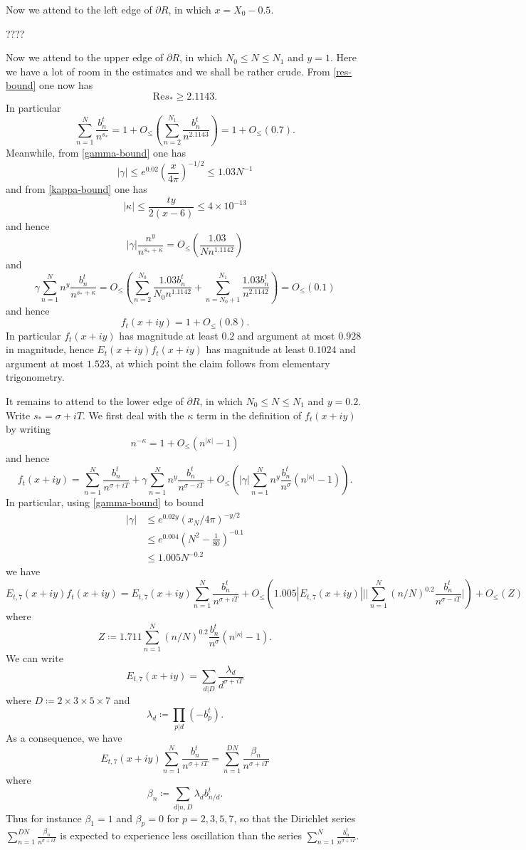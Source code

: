Now we attend to the left edge of $\partial R$, in which $x = X_0 - 0.5$.

????

Now we attend to the upper edge of $\partial R$, in which $N_0 \leq N \leq N_1$ and $y=1$.  Here we have a lot of room in the estimates and we shall be rather crude.  From \eqref{res-bound} one now has
$$ \mathrm{Re} s_* \geq 2.1143.$$
In particular
$$ \sum_{n=1}^N \frac{b_n^t}{n^{s_*}} = 1 + O_{\leq}( \sum_{n=2}^{N_1} \frac{b_n^t}{n^{2.1143}} ) = 1 + O_{\leq}( 0.7 ).$$
Meanwhile, from \eqref{gamma-bound} one has
$$ |\gamma| \leq e^{0.02} \left( \frac{x}{4\pi} \right)^{-1/2} \leq 1.03 N^{-1}$$
and from \eqref{kappa-bound} one has
$$ |\kappa| \leq \frac{ty}{2(x-6)} \leq 4 \times 10^{-13}$$
and hence
$$ |\gamma| \frac{n^y}{n^{s_* + \kappa}} = O_{\leq}( \frac{1.03}{N n^{1.1142}} )$$
and
$$   \gamma \sum_{n=1}^N n^y \frac{b_n^t}{n^{\overline{s_*} + \kappa}} = O_{\leq}( \sum_{n=2}^{N_0} \frac{1.03 b_n^t}{N_0 n^{1.1142}} + \sum_{n=N_0+1}^{N_1} \frac{1.03 b_n^t}{n^{2.1142}} ) = O_{\leq}( 0.1 )$$
and hence
$$ f_t(x+iy) = 1 + O_{\leq}(0.8).$$
In particular $f_t(x+iy)$ has magnitude at least $0.2$ and argument at most $0.928$ in magnitude, hence $E_t(x+iy) f_t(x+iy)$ has magnitude at least $0.1024$ and argument at most $1.523$, at which point the claim follows from elementary trigonometry.

It remains to attend to the lower edge of $\partial R$, in which $N_0 \leq N \leq N_1$ and $y=0.2$.
Write $s_* = \sigma + iT$.  We first deal with the $\kappa$ term in the definition of $f_t(x+iy)$ by writing
$$ n^{-\kappa} = 1 + O_{\leq}( n^{|\kappa|}-1)$$
and hence
$$ f_t(x+iy) = \sum_{n=1}^N \frac{b_n^t}{n^{\sigma+iT}} + \gamma \sum_{n=1}^N n^y \frac{b_n^t}{n^{\sigma-iT}}
+ O_{\leq}( |\gamma| \sum_{n=1}^N n^y \frac{b_n^t}{n^\sigma} (n^{|\kappa|}-1) ).$$
In particular, using \eqref{gamma-bound} to bound
\begin{align*}
|\gamma| &\leq e^{0.02y} (x_N/4\pi)^{-y/2} \\
&\leq e^{0.004} (N^2 - \frac{1}{80}  )^{-0.1} \\
&\leq 1.005 N^{-0.2}
\end{align*}
we have
$$ E_{t,7}(x+iy) f_t(x+iy) = E_{t,7}(x+iy) \sum_{n=1}^N \frac{b_n^t}{n^{\sigma+iT}} + O_{\leq}( 1.005 |E_{t,7}(x+iy)| |
|\sum_{n=1}^N (n/N)^{0.2} \frac{b_n^t}{n^{\sigma-iT}}| )
+ O_{\leq}( Z )$$
where
$$ Z \coloneqq 1.711 \sum_{n=1}^N (n/N)^{0.2} \frac{b_n^t}{n^\sigma} (n^{|\kappa|}-1).$$
We can write
$$ E_{t,7}(x+iy) = \sum_{d|D} \frac{\lambda_d}{d^{\sigma+iT}}$$
where $D \coloneqq 2 \times 3 \times 5 \times 7$ and
$$ \lambda_d \coloneqq \prod_{p|d} (-b_p^t).$$
As a consequence, we have
$$ E_{t,7}(x+iy) \sum_{n=1}^N \frac{b_n^t}{n^{\sigma+iT}} = \sum_{n=1}^{DN} \frac{\beta_{n}}{n^{\sigma+iT}}$$
where
$$ \beta_{n} \coloneqq \sum_{d|n,D} \lambda_d b_{n/d}^t.$$
Thus for instance $\beta_1 = 1$ and $\beta_p = 0$ for $p=2,3,5,7$, so that the Dirichlet series $\sum_{n=1}^{DN} \frac{\beta_n}{n^{\sigma+iT}}$ is expected to experience less oscillation than the series $\sum_{n=1}^N \frac{b_n^t}{n^{\sigma+iT}}$.


